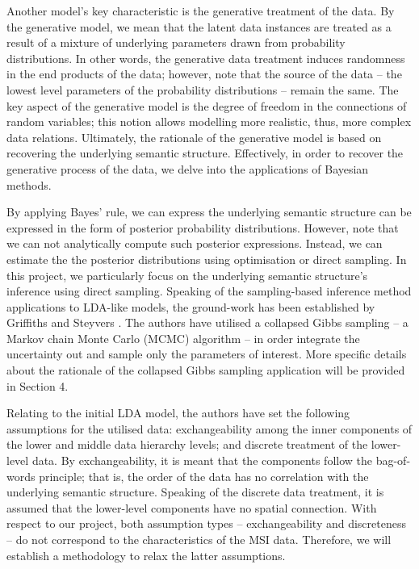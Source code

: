 \documentclass{mpaper}
\begin{document}
\par Another model's key characteristic is the generative treatment of the data. By the generative model, we mean that the latent data instances are treated as a result of a mixture of underlying parameters drawn from probability distributions. In other words, the generative data treatment induces randomness in the end products of the data; however, note that the source of the data -- the lowest level parameters of the probability distributions -- remain the same. The key aspect of the generative model is the degree of freedom in the connections of random variables; this notion allows modelling more realistic, thus, more complex data relations. Ultimately, the rationale of the generative model is based on recovering the underlying semantic structure. Effectively, in order to recover the generative process of the data, we delve into the applications of Bayesian methods.

\par By applying Bayes' rule, we can express the underlying semantic structure can be expressed in the form of posterior probability distributions. However, note that we can not analytically compute such posterior expressions. Instead, we can estimate the the posterior distributions using optimisation or direct sampling. In this project, we particularly focus on the underlying semantic structure's inference using direct sampling. Speaking of the sampling-based inference method applications to LDA-like models, the ground-work has been established by Griffiths and Steyvers \cite{griffiths2004finding}. The authors have utilised a collapsed Gibbs sampling -- a Markov chain Monte Carlo (MCMC) algorithm -- in order integrate the uncertainty out and sample only the parameters of interest. More specific details about the rationale of the collapsed Gibbs sampling application will be provided in Section 4. 

\par Relating to the initial LDA model, the authors have set the following assumptions for the utilised data: exchangeability among the inner components of the lower and middle data hierarchy levels; and discrete treatment of the lower-level data. By exchangeability, it is meant that the components follow the bag-of-words principle; that is, the order of the data has no correlation with the underlying semantic structure. Speaking of the discrete data treatment, it is assumed that the lower-level components have no spatial connection. With respect to our project, both assumption types -- exchangeability and discreteness -- do not correspond to the characteristics of the MSI data. Therefore, we will establish a methodology to relax the latter assumptions.
\end{document}
